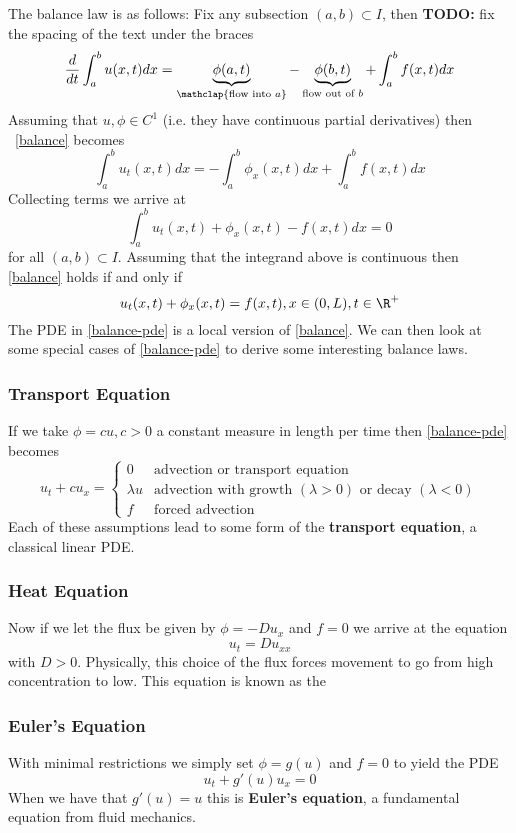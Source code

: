 \documentclass{bkcnotes}
\newcommand{\todo}[1]{{\bf TODO: } #1\\}
\begin{document}
The balance law is as follows: Fix any subsection $(a,b) \subset
I$, then
\todo{fix the spacing of the text under the braces}
\begin{equation}
  \label{eq:balance}
  \frac{d}{dt} \int_a^b u(x,t)dx =
  \underbrace{\phi(a,t)}_{\mathclap{\text{flow into } a}} -
  \underbrace{\phi(b,t)}_{\text{flow out of } b} +
  \int_a^b f(x,t)dx
\end{equation}
Assuming that $u,\phi \in C^1$ (i.e. they have continuous partial
derivatives) then ~\ref{balance} becomes
\[
\int_a^b u_t(x,t)dx = -\int_a^b \phi_x(x,t)dx + \int_a^b f(x,t)dx
\]
Collecting terms we arrive at
\[
\int_a^b u_t(x,t) + \phi_x(x,t) - f(x,t)dx = 0
\]
for all $(a,b) \subset I$. Assuming that the integrand above is
continuous then \ref{balance} holds if and only if
\begin{equation}
  \label{eq:balance-pde}
  u_t(x,t) + \phi_x(x,t) = f(x,t), x \in (0,L), t \in \R^+
\end{equation}
The PDE in \ref{balance-pde} is a local version of \ref{balance}. We
can then look at some special cases of \ref{balance-pde} to derive
some interesting balance laws.
\subsubsection{Transport Equation}
If we take $\phi = cu, c > 0$ a constant measure in length per time
then \ref{balance-pde} becomes
\[
u_t + cu_x =
\begin{cases}
  0         & \text{advection or transport equation} \\
  \lambda u & \text{advection with growth }(\lambda > 0)
              \text{ or decay }(\lambda < 0) \\
  f         & \text{forced advection}
\end{cases}
\]
Each of these assumptions lead to some form of the {\bf transport
  equation}, a classical linear PDE.

\subsubsection{Heat Equation}
Now if we let the flux be given by $\phi = - Du_x$ and $f = 0$ we
arrive at the equation
\[
u_t = Du_{xx}
\]
with $D > 0$. Physically, this choice of the flux forces movement to
go from high concentration to low. This equation is known as the {\bf}

\subsubsection{Euler's Equation}
With minimal restrictions we simply set $\phi = g(u)$ and $f = 0$ to
yield the PDE
\[
u_t + g'(u)u_x = 0
\]
When we have that $g'(u) = u$ this is {\bf Euler's equation}, a
fundamental equation from fluid mechanics.
\end{document}
